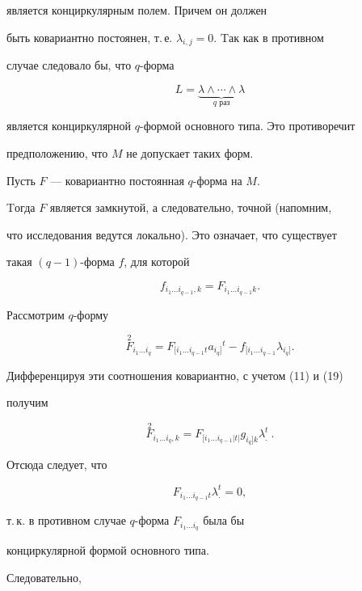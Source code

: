 является конциркулярным полем. Причем он должен 


быть ковариантно постоянен, т.\,е. $\lambda_{i,j}=0$. Tак как в противном


случае следовало бы, что $q$-форма


$$


L=\underbrace{\lambda\wedge\dotsb\wedge\lambda}_{q\text{ раз}}


$$


является конциркулярной $q$-формой основного типа. Это противоречит 


предположению, что $M$ не допускает таких форм.


Пусть $F$ --- ковариантно постоянная $q$-форма на $M$. 


Tогда $F$ является замкнутой, а следовательно, точной (напомним, 


что исследования ведутся локально). Это означает, что существует


такая $(q-1)$-форма $f$, для которой


\begin{equation}


f_{i_1\dotsc i_{q-1},k}=F_{i_1\dotsc i_{q-1}k}.


\end{equation}


Рассмотрим $q$-форму 


$$


\overset{2}{F}{}_{i_1\dotsc i_q}


=F_{[i_1\dotsc i_{q-1}t}a_{i_{q}]}{}^t-


f_{[i_1\dotsc i_{q-1}}\lambda_{{i_q}]}.


$$


Дифференцируя эти соотношения ковариантно, с учетом (11) и (19)


получим


$$


\overset{2}{F}{}_{i_1\dotsc i_q, k}=


F_{[i_1\dotsc i_{q-1}|t| }g_{i_{q}] k}\lambda^t_. \ .


$$


Отсюда следует, что


$$


F_{i_1\dotsc i_{q-1}t }\lambda_.^t=0,


$$


т.\,к. в противном случае $q$-форма $F_{i_1\dotsc i_q }$ была бы


конциркулярной формой основного типа.


Следовательно,


